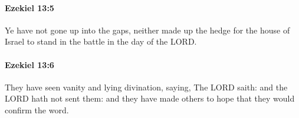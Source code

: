		\paragraph{Ezekiel 13:5} %
			\label{EZEKIEL-13-5}

			Ye have not gone up into the gaps, neither made up the hedge for the house of Israel to stand in the battle in the day of the LORD.


		\paragraph{Ezekiel 13:6} %
			\label{EZEKIEL-13-6}

			They have seen vanity and lying divination, saying, The LORD saith: and the LORD hath not sent them: and they have made others to hope that they would confirm the word.


